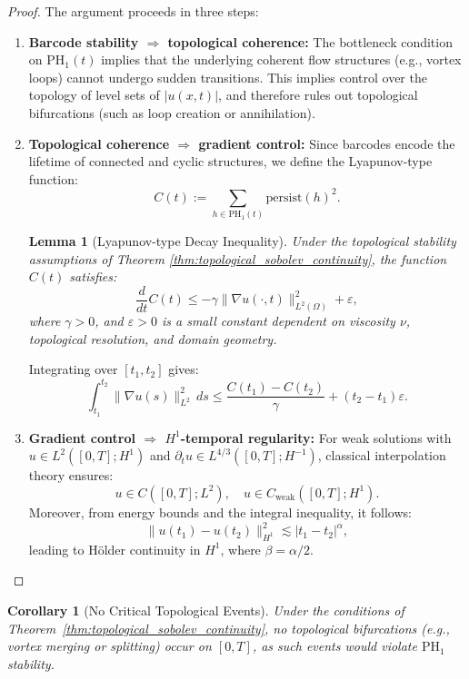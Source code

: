 \documentclass[11pt]{article}
\newtheorem{lemma}[theorem]{Lemma}
\newtheorem{corollary}[theorem]{Corollary}
\theoremstyle{definition}
\begin{document}
\begin{proof}
The argument proceeds in three steps:

\begin{enumerate}
    \item \textbf{Barcode stability $\Rightarrow$ topological coherence:} The bottleneck condition on $\mathrm{PH}_1(t)$ implies that the underlying coherent flow structures (e.g., vortex loops) cannot undergo sudden transitions. This implies control over the topology of level sets of $|u(x,t)|$, and therefore rules out topological bifurcations (such as loop creation or annihilation).

    \item \textbf{Topological coherence $\Rightarrow$ gradient control:} Since barcodes encode the lifetime of connected and cyclic structures, we define the Lyapunov-type function:
    \[
    C(t) := \sum_{h \in \mathrm{PH}_1(t)} \mathrm{persist}(h)^2.
    \]

    \begin{lemma}[Lyapunov-type Decay Inequality]
    \label{lem:lyapunov_decay}
    Under the topological stability assumptions of Theorem \ref{thm:topological_sobolev_continuity}, the function $C(t)$ satisfies:
    \[
    \frac{d}{dt}C(t) \leq -\gamma \|\nabla u(\cdot,t)\|_{L^2(\Omega)}^2 + \varepsilon,
    \]
    where $\gamma > 0$, and $\varepsilon > 0$ is a small constant dependent on viscosity $\nu$, topological resolution, and domain geometry.
    \end{lemma}

    Integrating over $[t_1,t_2]$ gives:
    \[
    \int_{t_1}^{t_2} \|\nabla u(s)\|_{L^2}^2 \, ds \leq \frac{C(t_1)-C(t_2)}{\gamma} + (t_2 - t_1)\varepsilon.
    \]

    \item \textbf{Gradient control $\Rightarrow$ $H^1$-temporal regularity:}
    For weak solutions with $u \in L^2([0,T]; H^1)$ and $\partial_t u \in L^{4/3}([0,T]; H^{-1})$, classical interpolation theory ensures:
    \[
    u \in C([0,T]; L^2), \quad u \in C_{\text{weak}}([0,T]; H^1).
    \]
    Moreover, from energy bounds and the integral inequality, it follows:
    \[
    \|u(t_1) - u(t_2)\|_{H^1}^2 \lesssim |t_1 - t_2|^{\alpha},
    \]
    leading to Hölder continuity in $H^1$, where $\beta = \alpha/2$.
\end{enumerate}
\end{proof}

\begin{corollary}[No Critical Topological Events]
Under the conditions of Theorem~\ref{thm:topological_sobolev_continuity}, no topological bifurcations (e.g., vortex merging or splitting) occur on $[0,T]$, as such events would violate $\mathrm{PH}_1$ stability.
\end{corollary}
\end{document}
